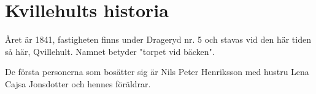 \chapter{Kvillehults historia}
Året är 1841, fastigheten finns under Drageryd nr. 5 och stavas vid den här tiden så här, Qvillehult.
Namnet betyder "torpet vid bäcken".

De första personerna som bosätter sig är Nils Peter Henriksson med hustru Lena Cajsa Jonsdotter och hennes föräldrar.
